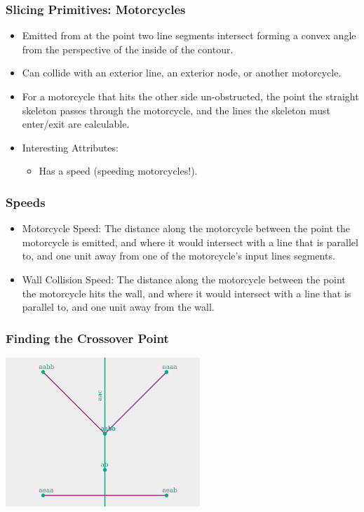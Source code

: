 \documentclass[hyperref={pdfpagemode=FullScreen},aspectratio=169]{beamer}
\begin{document}
\begin{frame}
  \frametitle{Slicing Primitives: Motorcycles}
  \begin{itemize}
  \item Emitted from at the point two line segments intersect forming a convex angle from the perspective of the inside of the contour.
  \item Can collide with an exterior line, an exterior node, or another motorcycle.
  \item For a motorcycle that hits the other side un-obstructed, the point the straight skeleton passes through the motorcycle, and the lines the skeleton must enter/exit are calculable.
  \item Interesting Attributes:
    \begin {itemize}
      \item Has a speed (speeding motorcycles!).
    \end{itemize}
  \end{itemize}
\end{frame}

\begin{frame}
  \frametitle{Speeds}
  \begin{itemize}
  \item Motorcycle Speed: The distance along the motorcycle between the point the motorcycle is emitted, and where it would intersect with a line that is parallel to, and one unit away from one of the motorcycle's input lines segments.
  \item Wall Collision Speed: The distance along the motorcycle between the point the motorcycle hits the wall, and where it would intersect with a line that is parallel to, and one unit away from the wall.
  \end{itemize}
\end{frame}

\begin{frame}
  \frametitle{Finding the Crossover Point}
  \includegraphics[width=0.55\textwidth, center]{C3-motorcycle-point-nogrid.png}
\end{frame}
\end{document}
